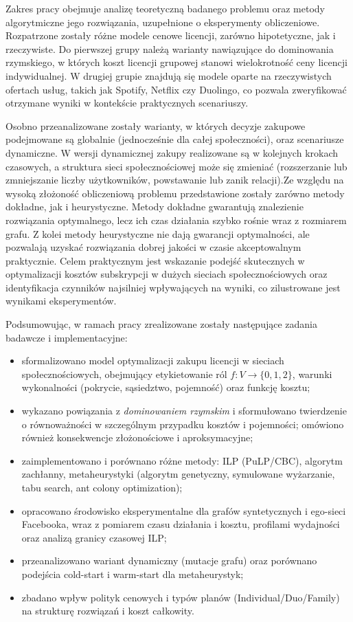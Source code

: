 Zakres pracy obejmuje analizę teoretyczną badanego problemu oraz metody algorytmiczne jego rozwiązania, uzupełnione o eksperymenty obliczeniowe. Rozpatrzone zostały różne modele cenowe licencji, zarówno hipotetyczne, jak i rzeczywiste. Do pierwszej grupy należą warianty nawiązujące do dominowania rzymskiego, w których koszt licencji grupowej stanowi wielokrotność ceny licencji indywidualnej. W drugiej grupie znajdują się modele oparte na rzeczywistych ofertach usług, takich jak Spotify, Netflix czy Duolingo, co pozwala zweryfikować otrzymane wyniki w kontekście praktycznych scenariuszy.


Osobno przeanalizowane zostały warianty, w których decyzje zakupowe podejmowane są globalnie (jednocześnie dla całej społeczności), oraz scenariusze dynamiczne. W wersji dynamicznej zakupy realizowane są w kolejnych krokach czasowych, a struktura sieci społecznościowej może się zmieniać (rozszerzanie lub zmniejszanie liczby użytkowników, powstawanie lub zanik relacji).Ze względu na wysoką złożoność obliczeniową problemu przedstawione zostały zarówno metody dokładne, jak i heurystyczne. Metody dokładne gwarantują znalezienie rozwiązania optymalnego, lecz ich czas działania szybko rośnie wraz z rozmiarem grafu. Z kolei metody heurystyczne nie dają gwarancji optymalności, ale pozwalają uzyskać rozwiązania dobrej jakości w czasie akceptowalnym praktycznie. Celem praktycznym jest wskazanie podejść skutecznych w optymalizacji kosztów subskrypcji w dużych sieciach społecznościowych oraz identyfikacja czynników najsilniej wpływających na wyniki, co zilustrowane jest wynikami eksperymentów.

Podsumowując, w ramach pracy zrealizowane zostały następujące zadania badawcze i implementacyjne:
\begin{itemize}
  \item sformalizowano model optymalizacji zakupu licencji w sieciach społecznościowych, obejmujący etykietowanie ról $f:V\to\{0,1,2\}$, warunki wykonalności (pokrycie, sąsiedztwo, pojemność) oraz funkcję kosztu;
  \item wykazano powiązania z \emph{dominowaniem rzymskim} i sformułowano twierdzenie o równoważności w szczególnym przypadku kosztów i pojemności; omówiono również konsekwencje złożonościowe i aproksymacyjne;
  \item zaimplementowano i porównano różne metody: ILP (PuLP/CBC), algorytm zachłanny, metaheurystyki (algorytm genetyczny, symulowane wyżarzanie, tabu search, ant colony optimization);
  \item opracowano środowisko eksperymentalne dla grafów syntetycznych i ego-sieci Facebooka, wraz z pomiarem czasu działania i kosztu, profilami wydajności oraz analizą granicy czasowej ILP;
  \item przeanalizowano wariant dynamiczny (mutacje grafu) oraz porównano podejścia cold-start i warm-start dla metaheurystyk;
  \item zbadano wpływ polityk cenowych i typów planów (Individual/Duo/Family) na strukturę rozwiązań i koszt całkowity.
\end{itemize}

